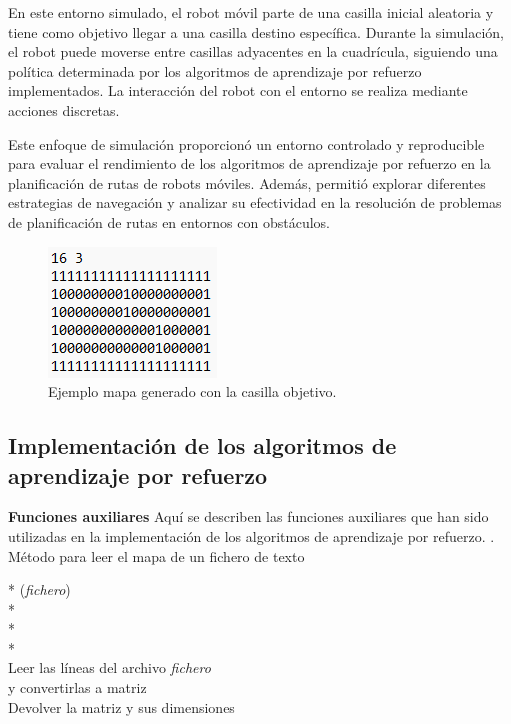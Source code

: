 \documentclass[conference,a4paper]{IEEEtran}
\begin{document}
En este entorno simulado, el robot móvil parte de una casilla inicial aleatoria y tiene como objetivo llegar a una casilla destino específica. Durante la simulación, el robot puede moverse entre casillas adyacentes en la cuadrícula, siguiendo una política determinada por los algoritmos de aprendizaje por refuerzo implementados. La interacción del robot con el entorno se realiza mediante acciones discretas.\newline

Este enfoque de simulación proporcionó un entorno controlado y reproducible para evaluar el rendimiento de los algoritmos de aprendizaje por refuerzo en la planificación de rutas de robots móviles. Además, permitió explorar diferentes estrategias de navegación y analizar su efectividad en la resolución de problemas de planificación de rutas en entornos con obstáculos.\newline

\begin{figure}[h]
  \centering
  \includegraphics{Ejemplo_mapa.png}
  \caption{Ejemplo mapa generado con la casilla objetivo.}
  \label{fig:Ejemplo_mapa}
\end{figure}

\subsection{Implementación de los algoritmos de aprendizaje por refuerzo}

\textbf{Funciones auxiliares\newline}
Aquí se describen las funciones auxiliares que han sido utilizadas en la implementación de los algoritmos de aprendizaje por refuerzo.\newline
\newline\newline\newline{}. Método para leer el mapa de un fichero de texto
  \begin{pseudo}*
    (\textit{fichero}) \\*
     \\*
     \\*
    \\
    Leer las líneas del archivo \textit{fichero}\\
    y convertirlas a matriz\\
    Devolver la matriz y sus dimensiones
  \end{pseudo}
\end{document}
